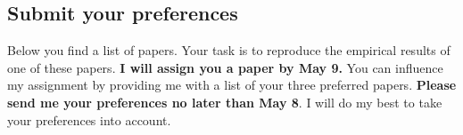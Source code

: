 \documentclass[
  a4paper,
  onecolumn,
  oneside]{scrartcl}
\begin{document}
\subsection{Submit your preferences}\label{submit-your-preferences}

Below you find a list of papers. Your task is to reproduce the empirical
results of one of these papers. \textbf{I will assign you a paper by May
9.} You can influence my assignment by providing me with a list of your
three preferred papers. \textbf{Please send me your preferences no later
than May 8}. I will do my best to take your preferences into account.

\begin{tcolorbox}[enhanced jigsaw, toprule=.15mm, breakable, opacityback=0, arc=.35mm, left=2mm, leftrule=.75mm, colback=white, colframe=quarto-callout-tip-color-frame, rightrule=.15mm, bottomrule=.15mm]


\end{tcolorbox}
\end{document}
